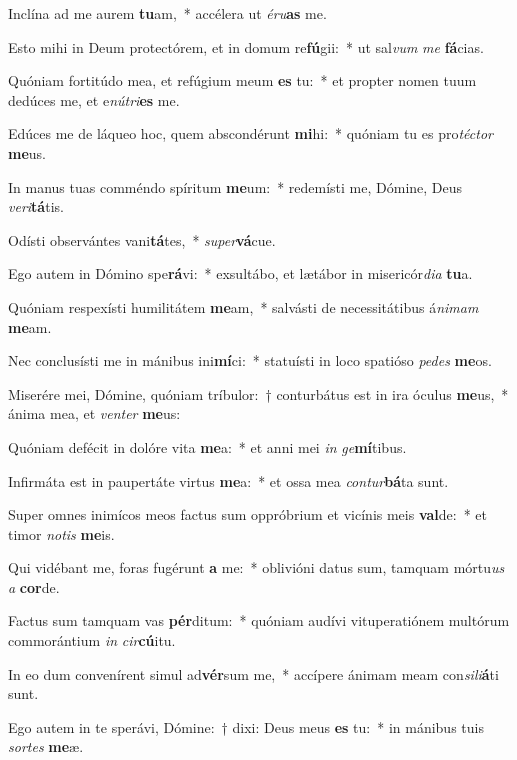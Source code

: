 \item Inclína ad me aurem \textbf{tu}am,~* accélera ut \textit{é}\textit{ru}\textbf{as} me.
\item Esto mihi in Deum protectórem, et in domum re\textbf{fú}gii:~* ut sal\textit{vum} \textit{me} \textbf{fá}cias.
\item Quóniam fortitúdo mea, et refúgium meum \textbf{es} tu:~* et propter nomen tuum dedúces me, et e\textit{nú}\textit{tri}\textbf{es} me.
\item Edúces me de láqueo hoc, quem abscondérunt \textbf{mi}hi:~* quóniam tu es pro\textit{téc}\textit{tor} \textbf{me}us.
\item In manus tuas comméndo spíritum \textbf{me}um:~* redemísti me, Dómine, Deus \textit{ve}\textit{ri}\textbf{tá}tis.
\item Odísti observántes vani\textbf{tá}tes,~* \textit{su}\textit{per}\textbf{vá}cue.
\item Ego autem in Dómino spe\textbf{rá}vi:~* exsultábo, et lætábor in misericór\textit{di}\textit{a} \textbf{tu}a.
\item Quóniam respexísti humilitátem \textbf{me}am,~* salvásti de necessitátibus á\textit{ni}\textit{mam} \textbf{me}am.
\item Nec conclusísti me in mánibus ini\textbf{mí}ci:~* statuísti in loco spatióso \textit{pe}\textit{des} \textbf{me}os.
\item Miserére mei, Dómine, quóniam tríbulor:~† conturbátus est in ira óculus \textbf{me}us,~* ánima mea, et \textit{ven}\textit{ter} \textbf{me}us:
\item Quóniam defécit in dolóre vita \textbf{me}a:~* et anni mei \textit{in} \textit{ge}\textbf{mí}tibus.
\item Infirmáta est in paupertáte virtus \textbf{me}a:~* et ossa mea \textit{con}\textit{tur}\textbf{bá}ta sunt.
\item Super omnes inimícos meos factus sum oppróbrium et vicínis meis \textbf{val}de:~* et timor \textit{no}\textit{tis} \textbf{me}is.
\item Qui vidébant me, foras fugérunt \textbf{a} me:~* oblivióni datus sum, tamquam mórtu\textit{us} \textit{a} \textbf{cor}de.
\item Factus sum tamquam vas \textbf{pér}ditum:~* quóniam audívi vituperatiónem multórum commorántium \textit{in} \textit{cir}\textbf{cú}itu.
\item In eo dum convenírent simul ad\textbf{vér}sum me,~* accípere ánimam meam con\textit{si}\textit{li}\textbf{á}ti sunt.
\item Ego autem in te sperávi, Dómine:~† dixi: Deus meus \textbf{es} tu:~* in mánibus tuis \textit{sor}\textit{tes} \textbf{me}æ.
